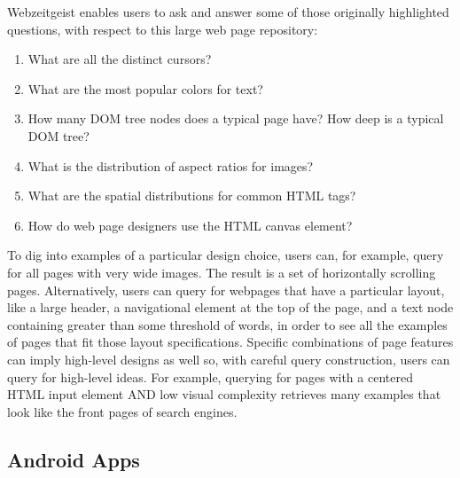Webzeitgeist enables users to ask and answer some of those originally highlighted questions, with respect to this large web page repository:
\begin{enumerate}
\item    What are all the distinct cursors?
\item    What are the most popular colors for text?
\item    How many DOM tree nodes does a typical page have? How deep is a typical DOM tree?
\item    What is the distribution of aspect ratios for images?
\item    What are the spatial distributions for common HTML tags?
\item    How do web page designers use the HTML canvas element?
\end{enumerate}

To dig into examples of a particular design choice, users can, for example, query for all pages with very wide images. The result is a set of horizontally scrolling pages. Alternatively, users can query for webpages that have a particular layout, like a large header, a navigational element at the top of the page, and a text node containing greater than some threshold of words, in order to see all the examples of pages that fit those layout specifications. Specific combinations of page features can imply high-level designs as well so, with careful query construction, users can query for high-level ideas. For example, querying for pages with a centered HTML input element AND low visual complexity retrieves many examples that look like the front pages of search engines.

\subsection{Android Apps}

